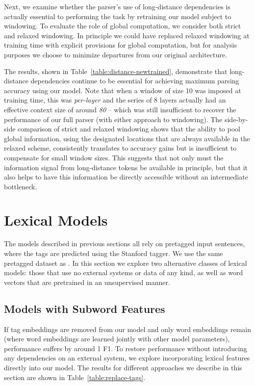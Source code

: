 \documentclass[11pt,a4paper]{article}
\begin{document}
Next, we examine whether the parser's use of long-distance dependencies is actually essential to performing the task by retraining our model subject to windowing. To evaluate the role of global computation, we consider both strict and relaxed windowing. In principle we could have replaced relaxed windowing at training time with explicit provisions for global computation, but for analysis purposes we choose to minimize departures from our original architecture.

The results, shown in Table~\ref{table:distance-newtrained}, demonstrate that long-distance dependencies continue to be essential for achieving maximum parsing accuracy using our model. Note that when a window of size 10 was imposed at training time, this was \emph{per-layer} and the series of 8 layers actually had an effective context size of around \emph{80} -- which was still insufficient to recover the performance of our full parser (with either approach to windowing). The side-by-side comparison of strict and relaxed windowing shows that the ability to pool global information, using the designated locations that are always available in the relaxed scheme, consistently translates to accuracy gains but is insufficient to compensate for small window sizes. This suggests that not only must the information signal from long-distance tokens be available in principle, but that it also helps to have this information be directly accessible without an intermediate bottleneck.

\section{Lexical Models}
\label{sec:lexical}

The models described in previous sections all rely on pretagged input sentences, where the tags are predicted using the Stanford tagger. We use the same pretagged dataset as \citet{cross_span-based_2016}.
In this section we explore two alternative classes of lexical models: those that use no external systems or data of any kind, as well as word vectors that are pretrained in an unsupervised manner.

\subsection{Models with Subword Features}
\label{subsec:morpho}

If tag embeddings are removed from our model and only word embeddings remain (where word embeddings are learned jointly with other model parameters), performance suffers by around 1 F1. To restore performance without introducing any dependencies on an external system, we explore incorporating lexical features directly into our model. The results for different approaches we describe in this section are shown in Table~\ref{table:replace-tags}.
\end{document}
